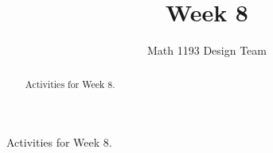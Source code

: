 \documentclass[noauthor]{ximera}
\title{Week 8}
\author{Math 1193 Design Team}
\begin{document}
\begin{abstract}
    Activities for Week 8.
\end{abstract}
\maketitle

Activities for Week 8.
\end{document}

